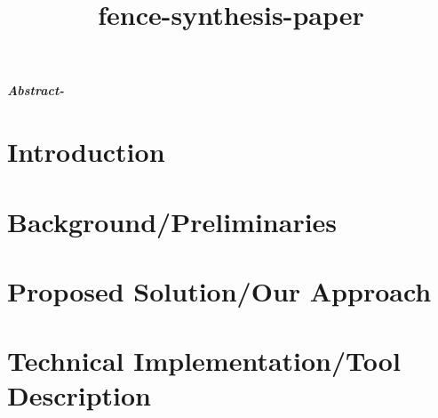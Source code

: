 \documentclass{article}
\title{fence-synthesis-paper}
\date{}
\begin{document}
\maketitle
\textit{\textbf{Abstract-}}

\section{Introduction} \label{sec:intro}


\section{Background/Preliminaries} \label{sec:intro}


\section{Proposed Solution/Our Approach}


\section{Technical Implementation/Tool Description}




\end{document}
